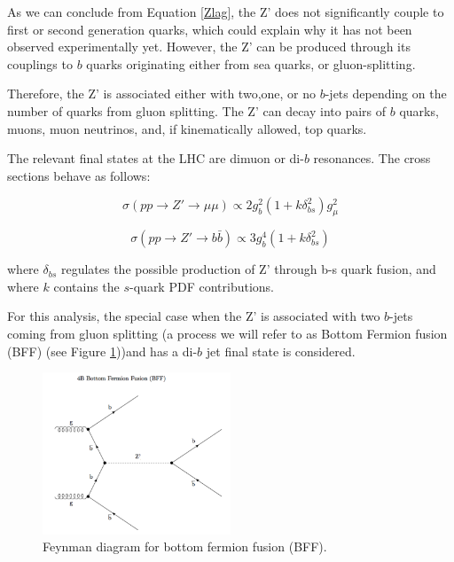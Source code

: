 As we can conclude from Equation \ref{Zlag}, the Z' does not significantly couple to first or second generation quarks, which could explain why it has not been observed experimentally yet. However, the Z' can be produced through its couplings to $b$ quarks originating either from sea quarks, or gluon-splitting. 

Therefore, the Z' is associated either with two,one, or no $b$-jets depending on the number of quarks from gluon splitting. The Z' can decay into pairs of $b$ quarks, muons, muon neutrinos, and, if kinematically allowed, top quarks. 

The relevant final states at the LHC are dimuon or di-$b$ resonances. The cross sections behave as follows:

\begin{equation}
\label{crossmu}
\sigma(pp\rightarrow Z' \rightarrow \mu\mu)\propto2g_{b}^{2}(1+k\delta_{bs}^{2})g_{\mu}^{2}
\end{equation}

\begin{equation}
\label{crossb}
\sigma(pp\rightarrow Z' \rightarrow b\bar{b})\propto3g_{b}^{4}(1+k\delta_{bs}^{2})
\end{equation}

where $\delta_{bs}$ regulates the possible production of Z' through b-s quark fusion, and where $k$ contains the $s$-quark PDF contributions. 

For this analysis, the special case when the Z' is associated with two $b$-jets coming from gluon splitting (a process we will refer to as Bottom Fermion fusion (BFF) (see Figure \ref{fig:bff}))and has a di-$b$ jet final state is considered.

 \begin{figure}[h]
 	\centering
 	\includegraphics[width=0.5\textwidth]{figures/bff.png}
 	\singlespace
 	\caption{Feynman diagram for bottom fermion fusion (BFF).}
 	\label{fig:bff}
 \end{figure}


